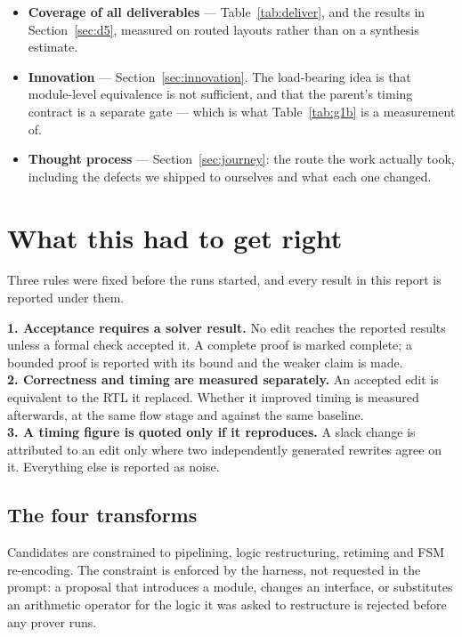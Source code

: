 \documentclass[11pt,a4paper]{article}
\newcommand{\claim}[1]{%
  \par\smallskip\noindent
  \colorbox{accent!6}{%
    \begin{minipage}{\dimexpr\linewidth-2\fboxsep}
      \vspace{3pt}#1\vspace{3pt}
    \end{minipage}}\par\smallskip}
\begin{document}
\begin{itemize}[leftmargin=*,itemsep=2pt]
\item \textbf{Coverage of all deliverables} --- Table~\ref{tab:deliver}, and
the results in Section~\ref{sec:d5}, measured on routed layouts rather than on
a synthesis estimate.
\item \textbf{Innovation} --- Section~\ref{sec:innovation}. The load-bearing
idea is that module-level equivalence is not sufficient, and that the parent's
timing contract is a separate gate --- which is what
Table~\ref{tab:g1b} is a measurement of.
\item \textbf{Thought process} --- Section~\ref{sec:journey}: the route the
work actually took, including the defects we shipped to ourselves and what each
one changed.
\end{itemize}

\section{What this had to get right}

Three rules were fixed before the runs started, and every result in this report
is reported under them.

\claim{%
\textbf{1. Acceptance requires a solver result.} No edit reaches the reported
results unless a formal check accepted it. A complete proof is marked complete;
a bounded proof is reported with its bound and the weaker claim is made.\\[4pt]
\textbf{2. Correctness and timing are measured separately.} An accepted edit is
equivalent to the RTL it replaced. Whether it improved timing is measured
afterwards, at the same flow stage and against the same baseline.\\[4pt]
\textbf{3. A timing figure is quoted only if it reproduces.} A slack change is
attributed to an edit only where two independently generated rewrites agree on
it. Everything else is reported as noise.}

\subsection{The four transforms}

Candidates are constrained to pipelining, logic restructuring, retiming and FSM
re-encoding. The constraint is enforced by the harness, not requested in the
prompt: a proposal that introduces a module, changes an interface, or
substitutes an arithmetic operator for the logic it was asked to restructure is
rejected before any prover runs.
\end{document}
